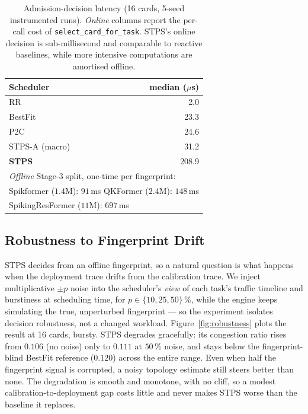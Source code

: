 \documentclass[letterpaper,twocolumn,10pt]{article}
\begin{document}
\begin{table}[t]
\centering
\caption{Admission-decision latency (16 cards, 5-seed instrumented runs). \emph{Online} columns report the per-call cost of \texttt{select\_card\_for\_task}. STPS's online decision is sub-millisecond and comparable to reactive baselines, while more intensive computations are amortised offline.}
\label{tab:overhead}
\small
\begin{tabular}{lr}
\toprule
Scheduler & median ($\mu$s) \\
\midrule
RR            & 2.0  \\
BestFit       & 23.3 \\
P2C           & 24.6 \\
STPS-A (macro)& 31.2 \\
\textbf{STPS} & 208.9 \\
\midrule
\multicolumn{2}{l}{\emph{Offline} Stage-3 split, one-time per fingerprint:} \\
\multicolumn{2}{l}{\quad Spikformer ($1.4$M): $91$\,ms \quad QKFormer ($2.4$M): $148$\,ms} \\
\multicolumn{2}{l}{\quad SpikingResFormer ($11$M): $697$\,ms} \\
\bottomrule
\end{tabular}
\end{table}

\subsection{Robustness to Fingerprint Drift}
\label{sec:eval:robustness}

STPS decides from an offline fingerprint, so a natural question is what happens when the deployment trace drifts from the calibration trace. We inject multiplicative $\pm p$ noise into the scheduler's \emph{view} of each task's traffic timeline and burstiness at scheduling time, for $p\in\{10,25,50\}\,\%$, while the engine keeps simulating the true, unperturbed fingerprint --- so the experiment isolates decision robustness, not a changed workload. Figure~\ref{fig:robustness} plots the result at 16 cards, bursty. STPS degrades gracefully: its congestion ratio rises from $0.106$ (no noise) only to $0.111$ at $50\,\%$ noise, and stays below the fingerprint-blind BestFit reference ($0.120$) across the entire range. Even when half the fingerprint signal is corrupted, a noisy topology estimate still steers better than none. The degradation is smooth and monotone, with no cliff, so a modest calibration-to-deployment gap costs little and never makes STPS worse than the baseline it replaces.
\end{document}
